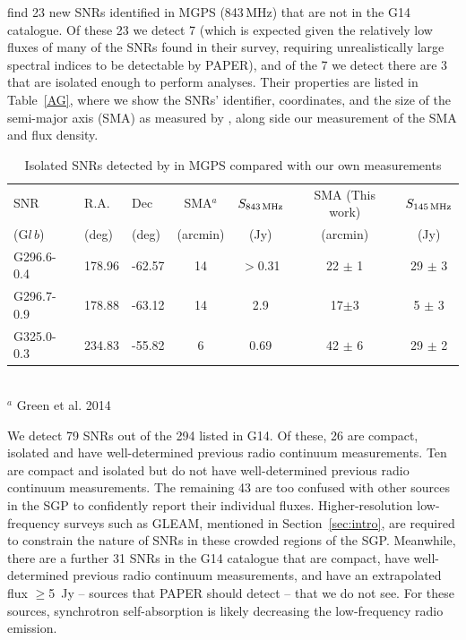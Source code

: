 \documentclass[useAMS,usenatbib]{mn2e}
\begin{document}
\cite{AGreen.14} find 23 new SNRs identified in MGPS (843\,MHz) that are not in the G14 catalogue. Of these 23 we detect 7 (which is expected given the relatively low fluxes of many of the SNRs found in their survey, requiring unrealistically large spectral indices to be detectable by PAPER), and of the 7 we detect there are 3 that are isolated enough to perform analyses. Their properties are listed in Table~\ref{AG}, where we show the SNRs' identifier, coordinates, and the size of the semi-major axis (SMA) as measured by \citep{AGreen.14}, along side our measurement of the SMA and flux density.

\begin{table}
\caption{Isolated SNRs detected by \protect\citep{AGreen.14} in MGPS compared with our own measurements}
\begin{tabular}{lllcccc}
\hline
SNR & R.A. & Dec & SMA$^a$ & $S_{843\,{\rm MHz}}$ & SMA (This work) & $S_{145\,{\rm MHz}}$ \\
(G$l\,b$)	&	(deg)	&	(deg)	&	(arcmin)	&	(Jy)		&	(arcmin)			&	(Jy)			\\
\hline
G296.6-0.4 & 178.96 & -62.57 & 14 & $>$0.31 & 22 $\pm$ 1 & 29 $\pm$ 3 \\
G296.7-0.9 & 178.88 & -63.12 & 14 & 2.9 & 17$\pm$3 & 5 $\pm$ 3 \\
G325.0-0.3 & 234.83 & -55.82 & 6   & 0.69 & 42 $\pm$ 6 & 29 $\pm$ 2 \\
\hline
\end{tabular}
\\
$^a$ Green et al. 2014
\label{tab:AG}
\end{table}

We detect 79 SNRs out of the 294 listed in G14. Of these, 26 are compact, isolated and have well-determined previous radio continuum measurements. Ten are compact and isolated but do not have well-determined previous radio continuum measurements. The remaining 43 are too confused with other sources in the SGP to confidently report their individual fluxes. Higher-resolution low-frequency surveys such as GLEAM, mentioned in Section~\ref{sec:intro}, are required to constrain the nature of SNRs in these crowded regions of the SGP. Meanwhile, there are a further 31 SNRs in the G14 catalogue that are compact, have well-determined previous radio continuum measurements, and have an extrapolated flux $\geq$5\, Jy -- sources that PAPER should detect -- that we do not see. For these sources, synchrotron self-absorption is likely decreasing the low-frequency radio emission.
\end{document}
